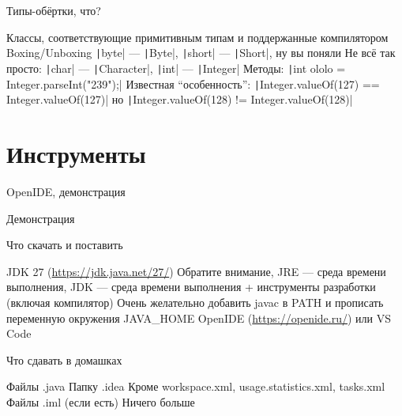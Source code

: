 \documentclass{../../slides-style}
\begin{document}
    \begin{frame}{Типы-обёртки, что?}
        \begin{outline}
            \1 Классы, соответствующие примитивным типам и поддержанные компилятором
            \1 Boxing/Unboxing
            \1 \texttt|byte| --- \texttt|Byte|, \texttt|short| --- \texttt|Short|, ну вы поняли
            \1 Не всё так просто: \texttt|char| --- \texttt|Character|, \texttt|int| --- \texttt|Integer|
            \1 Методы: \texttt|int ololo = Integer.parseInt("239");|
            \1 Известная \enquote{особенность}:
                \2 \texttt|Integer.valueOf(127) == Integer.valueOf(127)|
                \2 но \texttt|Integer.valueOf(128) != Integer.valueOf(128)|
        \end{outline}
    \end{frame}

    \section{Инструменты}

    \begin{frame}{OpenIDE, демонстрация}
        \begin{center}
            \huge{Демонстрация}
        \end{center}
    \end{frame}

    \begin{frame}{Что скачать и поставить}
        \begin{outline}
            \1 JDK 27 (\url{https://jdk.java.net/27/})
                \2 Обратите внимание, JRE --- среда времени выполнения, JDK --- среда времени выполнения + инструменты разработки (включая компилятор)
                \2 Очень желательно добавить javac в PATH и прописать переменную окружения JAVA\_HOME
            \1 OpenIDE (\url{https://openide.ru/}) или VS Code
        \end{outline}
    \end{frame}

    \begin{frame}{Что сдавать в домашках}
        \begin{outline}
            \1 Файлы .java
            \1 Папку .idea
                \2 Кроме workspace.xml, usage.statistics.xml, tasks.xml
            \1 Файлы .iml (если есть)
            \1 Ничего больше
        \end{outline}
    \end{frame}
\end{document}
